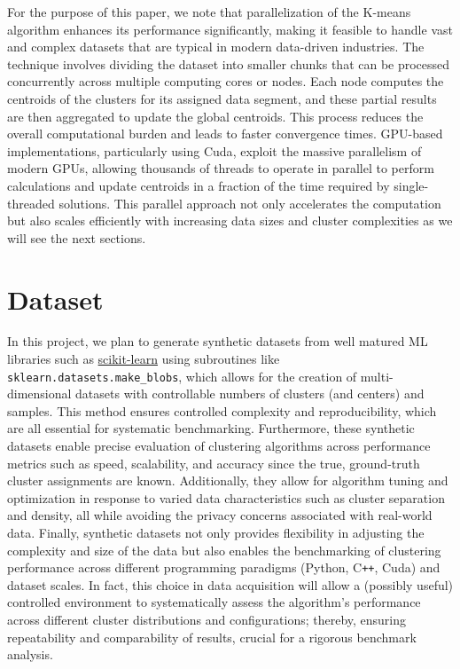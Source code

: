 \documentclass{article}
\begin{document}
  For the purpose of this paper, we note that parallelization of the {\sc K-means}
  algorithm enhances its performance significantly, making it feasible to handle
  vast and complex datasets that are typical in modern data-driven industries.
  The technique involves dividing the dataset into smaller chunks that can be
  processed concurrently across multiple computing cores or nodes. Each node computes
  the centroids of the clusters for its assigned data segment, and these partial
  results are then aggregated to update the global centroids. This process reduces
  the overall computational burden and leads to faster convergence times. GPU-based
  implementations, particularly using {\sc Cuda}, exploit the massive parallelism of modern
  GPUs, allowing thousands of threads to operate in parallel to perform calculations
  and update centroids in a fraction of the time required by single-threaded solutions.
  This parallel approach not only accelerates the computation but also scales efficiently
  with increasing data sizes and cluster complexities as we will see the next sections.

  \section{Dataset}
  In this project, we plan to generate synthetic datasets from well matured ML libraries
  such as \href{https://scikit-learn.org/}{\url{scikit-learn}} using subroutines like
  {\tt sklearn.datasets.make\_blobs}, which allows for the creation of multi-dimensional
  datasets with controllable numbers of clusters (and centers) and samples. This method
  ensures controlled complexity and reproducibility, which are all essential for systematic
  benchmarking. Furthermore, these synthetic datasets enable precise evaluation of clustering
  algorithms across performance metrics such as speed, scalability, and accuracy since
  the true, ground-truth cluster assignments are known. Additionally, they allow for
  algorithm tuning and optimization in response to varied data characteristics such as
  cluster separation and density, all while avoiding the privacy concerns associated with
  real-world data. Finally, synthetic datasets not only provides flexibility in adjusting
  the complexity and size of the data but also enables the benchmarking of clustering
  performance across different programming paradigms ({\sc Python, C{\tt ++}, Cuda}) and
  dataset scales. In fact, this choice in data acquisition will allow a (possibly useful)
  controlled environment to systematically assess the algorithm's performance across different
  cluster distributions and configurations; thereby, ensuring repeatability and comparability
  of results, crucial for a rigorous benchmark analysis.
\end{document}
